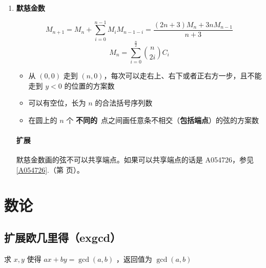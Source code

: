 \documentclass[a4paper, twoside]{article}
\newcommand\detailedref[1]{\ref{#1}.\nameref{#1}（第 \pageref{#1} 页）}
\begin{document}
\begin{enumerate}
            施罗德数的组合意义：
            
            \begin{itemize}
                \item 从 $(0, 0)$ 走到 $(n, n)$，每次可以走右、上或者右上一步，并且不能超过 $y=x$ 这条线的方案数
                \item 可以有空位，并且括号对数和空位置数加起来等于 $n$ 的合法括号序列数
                \item 凸 $n$ 边形的 \textbf{任意}\ 剖分方案数
            \end{itemize}
            
            （有些人会把大（而不是小）施罗德数叫做超级卡特兰数。）
            
            \item \textbf{默慈金数}
            
            $$ M_{n + 1} = M_n + \sum_{i = 0} ^ {n - 1} M_i M_{n - 1 - i} = \frac {(2n + 3)M_n + 3n M_{n - 1}} {n + 3} $$
            $$ M_n = \sum_{i = 0} ^ {\frac n 2} {n \choose 2i} C_i $$
            
            \begin{itemize}
                \item 从 $(0, 0)$ 走到 $(n, 0)$，每次可以走右上、右下或者正右方一步，且不能走到 $y<0$ 的位置的方案数
                \item 可以有空位，长为 $n$ 的合法括号序列数
                \item 在圆上的 $n$ 个 \textbf{不同的}\ 点之间画任意条不相交（\textbf{包括端点}）的弦的方案数
            \end{itemize}
            
            \paragraph{扩展} 默慈金数画的弦不可以共享端点。如果可以共享端点的话是 A054726，参见 \detailedref{A054726}。
            
            \end{enumerate}
        
    
\newpage
\section{数论}
    \subsection{扩展欧几里得（exgcd）}
    求 $x, y$ 使得 $ax+by=\gcd(a, b)$ ，返回值为 $\gcd(a, b)$
    \inputminted{cpp}{../src/数论/扩展欧几里得（exgcd）.cpp}
\end{document}
